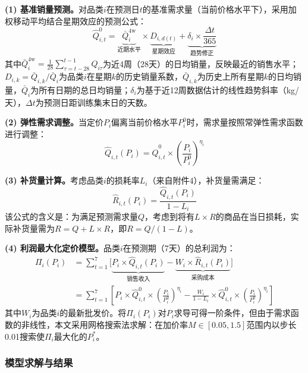 \documentclass[12pt,a4paper]{ctexart}
\begin{document}
\textbf{(1) 基准销量预测。}对品类$i$在预测日$t$的基准需求量（当前价格水平下），采用加权移动平均结合星期效应的预测公式：
\begin{equation}
    \hat{Q}_{i,t}^0 = \underbrace{\bar{Q}_{i}^{\text{4w}}}_{\text{近期水平}} \times \underbrace{D_{i,d(t)}}_{\text{星期效应}} + \underbrace{\delta_i \times \frac{\Delta t}{365}}_{\text{趋势修正}}
    \label{eq:pred_base}
\end{equation}
其中$\bar{Q}_{i}^{\text{4w}} = \frac{1}{28}\sum_{\tau=t-28}^{t-1} Q_{i\tau}$为近4周（28天）的日均销量，反映最近的销售水平；$D_{i,k} = \bar{Q}_{i,k} / \bar{Q}_i$为品类$i$在星期$k$的历史销量系数，$\bar{Q}_{i,k}$为历史上所有星期$k$的日均销量，$\bar{Q}_i$为所有日期的总日均销量；$\delta_i$为基于近12周数据估计的线性趋势斜率（kg/天），$\Delta t$为预测日距训练集末日的天数。

\textbf{(2) 弹性需求调整。}当定价$P_i$偏离当前价格水平$P_i^0$时，需求量按照常弹性需求函数进行调整：
\begin{equation}
    \hat{Q}_{i,t}(P_i) = \hat{Q}_{i,t}^0 \times \left(\frac{P_i}{P_i^0}\right)^{\eta_i}
    \label{eq:elastic_adj}
\end{equation}

\textbf{(3) 补货量计算。}考虑品类$i$的损耗率$L_i$（来自附件4），补货量需满足：
\begin{equation}
    \hat{R}_{i,t}(P_i) = \frac{\hat{Q}_{i,t}(P_i)}{1 - L_i}
    \label{eq:replenish}
\end{equation}
该公式的含义是：为满足预测需求量$Q$，考虑到将有$L \times R$的商品在当日损耗，实际补货量需为$R = Q + L \times R$，即$R = Q/(1-L)$。

\textbf{(4) 利润最大化定价模型。}品类$i$在预测期（7天）的总利润为：
\begin{align}
    \Pi_i(P_i) &= \sum_{t=1}^{7} \Big[\underbrace{P_i \times \hat{Q}_{i,t}(P_i)}_{\text{销售收入}} - \underbrace{W_i \times \hat{R}_{i,t}(P_i)}_{\text{采购成本}}\Big] \\
    &= \sum_{t=1}^{7} \left[P_i \times \hat{Q}_{i,t}^0 \times \left(\frac{P_i}{P_i^0}\right)^{\eta_i} - \frac{W_i}{1-L_i} \times \hat{Q}_{i,t}^0 \times \left(\frac{P_i}{P_i^0}\right)^{\eta_i}\right] \nonumber
\end{align}
其中$W_i$为品类$i$的最新批发价。将$\Pi_i(P_i)$对$P_i$求导可得一阶条件，但由于需求函数的非线性，本文采用网格搜索法求解：在加价率$M \in [0.05, 1.5]$范围内以步长0.01搜索使$\Pi_i$最大化的$P_i^*$。

\subsubsection{模型求解与结果}
\end{document}
